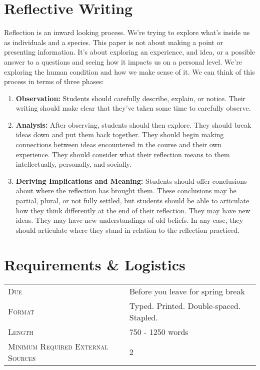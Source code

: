 \documentclass[]{tufte-handout}
\begin{document}
\section{Reflective Writing}

Reflection is an inward looking process. We're trying to explore what's inside us as individuals and a species. This paper is not about making a point or presenting information. It's about exploring an experience, and idea, or a possible answer to a questions and seeing how it impacts us on a personal level. We're exploring the human condition and how we make sense of it. We can think of this process in terms of three phases:
\begin{enumerate}
\item \textbf{Observation:} Students should carefully describe, explain, or notice. Their writing should make clear that they've taken some time to carefully observe. \newline
\item \textbf{Analysis:} After observing, students should then explore. They should break ideas down and put them back together. They should begin making connections between ideas encountered in the course and their own experience. They should consider what their reflection means to them intellectually, personally, and socially. \newline
\item \textbf{Deriving Implications and Meaning:} Students should offer conclusions about where the reflection has brought them. These conclusions may be partial, plural, or not fully settled, but students should be able to articulate how they think differently at the end of their reflection. They may have new ideas. They may have new understandings of old beliefs. In any case, they should articulate where they stand in relation to the reflection practiced. 
\end{enumerate}


\section{Requirements \& Logistics}

\begin{tabular}{ll}
\textsc{Due} & Before you leave for spring break  \\
\textsc{Format} & Typed. Printed. Double-spaced. Stapled. \\
\textsc{Length} & 750 - 1250 words \\
\textsc{Minimum Required External Sources} & 2
\end{tabular}
\end{document}
